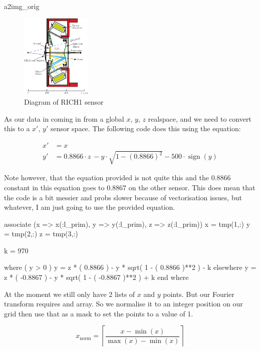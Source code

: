 \documentclass[10pt, a4paper]{article}
\DeclareMathOperator{\sign}{sign}
\begin{document}
\begin{codeblock}{a2img_orig}
\begin{figure}[h]
\centering
\includegraphics[width=0.3\textwidth]{Images/RICH.pdf}
\caption{Diagram of RICH1 sensor}
\label{fig:rich}
\end{figure}

As our data in coming in from a global $x$, $y$, $z$ realspace, and we need to convert this to a $x'$, $y'$ sensor space. 
The following code does this using the equation:

\begin{align}
 x' &= x \\
 y' &= 0.8866 \cdot z\ - y \cdot \sqrt{ 1 - ( 0.8866 )^2 } - 500\cdot \sign(y)   
\end{align}

Note however, that the equation provided is not quite this and the $0.8866$ constant in this equation goes to $0.8867$ on the other sensor. 
This does mean that the code is a bit messier and probs slower because of vectorisation issues, but whatever, I am just going to use the provided equation. 

\begin{code}
	associate (x => x(:l_prim), y => y(:l_prim), z => z(:l_prim))
		x = tmp(1,:)
		y = tmp(2,:)
		z = tmp(3,:)
		
		k = 970
		
		where ( y > 0 )
			y = z * (  0.8866 ) - y * sqrt( 1 - (  0.8866 )**2 ) - k
		elsewhere 
			y = z * ( -0.8867 ) - y * sqrt( 1 - ( -0.8867 )**2 ) + k
		end where
\end{code}

At the moment we still only have 2 lists of $x$ and $y$ points. But our Fourier transform requires and array.
So we normalise it to an integer position on our grid then use that as a mask to set the points to a value of 1.

\begin{equation}
x_\text{norm} = \left\lceil\frac{x - \min(x)}{\max(x) - \min(x)}\right\rceil
\label{eqn:norm}
\end{equation}


\end{codeblock}
\end{document}
